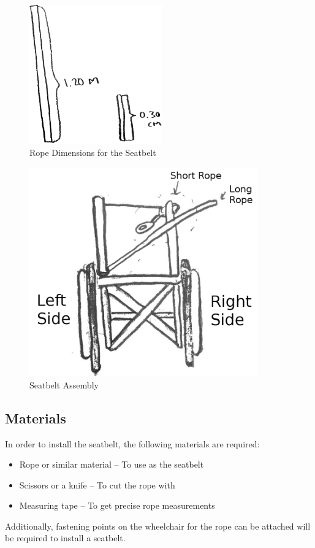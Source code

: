 \documentclass[12pt]{report}
\begin{document}
\begin{figure}[H]
    \centering
    \includegraphics[height=6cm]{ropesizes}
    \caption{Rope Dimensions for the Seatbelt}
\end{figure}

\begin{figure}[H]
    \centering
    \includegraphics[height=9cm]{sbasm}
    \caption{Seatbelt Assembly}
\end{figure}

\subsection{Materials}

In order to install the seatbelt, the following materials are required:

\begin{itemize}
\item Rope or similar material – To use as the seatbelt
\item Scissors or a knife – To cut the rope with
\item Measuring tape – To get precise rope measurements
\end{itemize}
Additionally, fastening points on the wheelchair for the rope can be attached
will be required to install a seatbelt.
\end{document}
